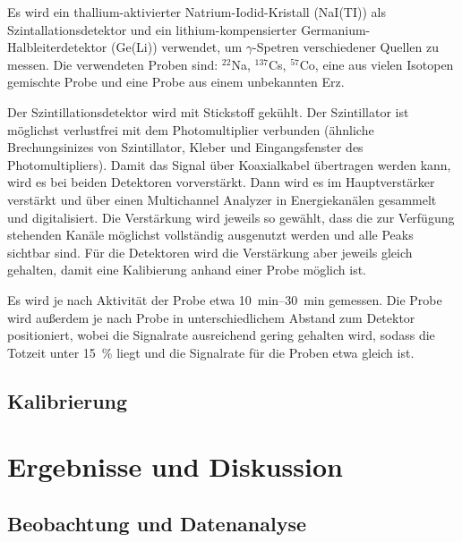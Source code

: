 \documentclass[
	a4paper,
	12pt,
	pagesize,
	ngerman
]{scrartcl}
\begin{document}
	Es wird ein thallium-aktivierter Natrium-Iodid-Kristall (NaI(TI)) als Szintallationsdetektor und  ein lithium-kompensierter Germanium-Halbleiterdetektor (Ge(Li)) verwendet, um $\gamma$-Spetren verschiedener Quellen zu messen.
	Die verwendeten Proben sind: $^22$Na, $^137$Cs, $^57$Co, eine aus vielen Isotopen gemischte Probe und eine Probe aus einem unbekannten Erz.

	Der Szintillationsdetektor wird mit Stickstoff gekühlt.
	Der Szintillator ist möglichst verlustfrei mit dem Photomultiplier verbunden (ähnliche Brechungsinizes von Szintillator, Kleber und Eingangsfenster des Photomultipliers).
	Damit das Signal über Koaxialkabel übertragen werden kann, wird es bei beiden Detektoren vorverstärkt.
	Dann wird es im Hauptverstärker verstärkt und über einen Multichannel Analyzer in Energiekanälen gesammelt und digitalisiert.
	Die Verstärkung wird jeweils so gewählt, dass die zur Verfügung stehenden Kanäle möglichst vollständig ausgenutzt werden und alle Peaks sichtbar sind.
	Für die Detektoren wird die Verstärkung aber jeweils gleich gehalten, damit eine Kalibierung anhand einer Probe möglich ist.

	Es wird je nach Aktivität der Probe etwa \SIrange{10}{30}{\minute} gemessen.
	Die Probe wird außerdem je nach Probe in unterschiedlichem Abstand zum Detektor positioniert, wobei die Signalrate ausreichend gering gehalten wird, sodass die Totzeit unter \SI{15}{\percent} liegt und die Signalrate für die Proben etwa gleich ist.

	\subsection{Kalibrierung}

	\section{Ergebnisse und Diskussion}


	\subsection{Beobachtung und Datenanalyse}
\end{document}
